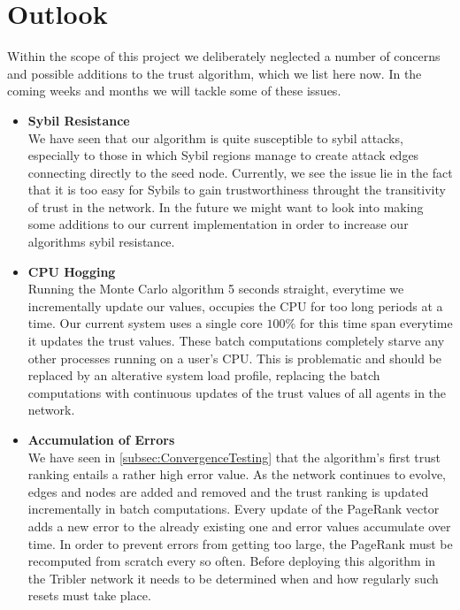 \documentclass[twocolumn]{article}
\theoremstyle{definition}
\theoremstyle{theorem}
\begin{document}
\section{Outlook}
Within the scope of this project we deliberately neglected a number of concerns and possible additions to the trust algorithm, which we list here now. In the coming weeks and months we will tackle some of these issues.
\begin{itemize}
\item {\bf Sybil Resistance} \\ We have seen that our algorithm is quite susceptible to sybil attacks, especially to those in which Sybil regions manage to create attack edges connecting directly to the seed node. Currently, we see the issue lie in the fact that it is too easy for Sybils to gain trustworthiness throught the transitivity of trust in the network. In the future we might want to look into making some additions to our current implementation in order to increase our algorithms sybil resistance.\vspace{1em}\\

\item {\bf CPU Hogging} \\ Running the Monte Carlo algorithm 5 seconds straight, everytime we incrementally update our values, occupies the CPU for too long periods at a time. Our current system uses a single core $100\%$ for this time span everytime it updates the trust values. These batch computations completely starve any other processes running on a user's CPU. This is problematic and should be replaced by an alterative system load profile, replacing the batch computations with continuous updates of the trust values of all agents in the network.\vspace{1em}\\

\item {\bf Accumulation of Errors} \\ We have seen in \ref{subsec:ConvergenceTesting} that the algorithm's first trust ranking entails a rather high error value. As the network continues to evolve, edges and nodes are added and removed and the trust ranking is updated incrementally in batch computations. Every update of the PageRank vector adds a new error to the already existing one and error values accumulate over time. In order to prevent errors from getting too large, the PageRank must be recomputed from scratch every so often. Before deploying this algorithm in the Tribler network it needs to be determined when and how regularly such resets must take place.\vspace{1em}\\


\end{itemize}
\end{document}
